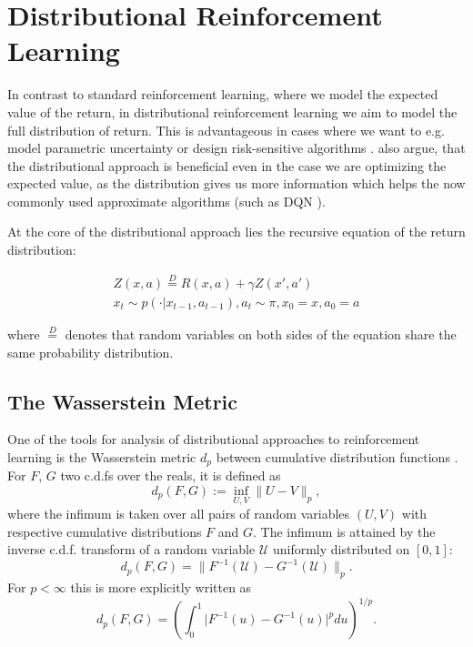 \section{Distributional Reinforcement Learning}

In contrast to standard reinforcement learning, where we model the expected value of the return, in distributional reinforcement learning \cite{many} we aim to model the full distribution of return. This is advantageous in cases where we want to e.g. model parametric uncertainty \cite{...} or design risk-sensitive algorithms \citep{morimura2012parametric}\citep{morimura2010nonparametric}. \citet{bellemare2017distributional} also argue, that the distributional approach is beneficial even in the case we are optimizing the expected value, as the distribution gives us more information which helps the now commonly used approximate algorithms (such as DQN \citep{mnih2015human}).

At the core of the distributional approach lies the recursive equation of the return distribution:

\begin{equation}
\begin{split}
Z(x, a) \overset{D}{=} R(x, a) + \gamma Z(x', a')\\
x_t \sim p(\cdot|x_{t-1}, a_{t-1}), a_t \sim \pi, x_0 = x, a_0 = a
\end{split}
\end{equation}

where $\overset{D}{=}$ denotes that random variables on both sides of the equation share the same probability distribution.

\subsection{The Wasserstein Metric}
\newcommand{\pnorm}[1]{\| #1 \|_p}

One of the tools for analysis of distributional approaches to reinforcement learning is the Wasserstein metric $d_p$ between cumulative distribution functions \citep[see e.g.][where it is called the Mallows metric]{bickel81asymptotic}. For $F$, $G$ two c.d.fs over the reals, it is defined as
\begin{equation*}
d_p(F, G) := \inf_{U, V} \pnorm{U - V},
\end{equation*}
where the infimum is taken over all pairs of random variables $(U, V)$ with respective cumulative distributions $F$ and $G$. The infimum is attained by the inverse c.d.f. transform of a random variable $\mathcal{U}$ uniformly distributed on $[0, 1]$:
\begin{equation*}
d_p(F, G) = \| F^{-1}(\mathcal{U}) - G^{-1}(\mathcal{U}) \|_p .
\end{equation*}
For $p < \infty$ this is more explicitly written as
\begin{equation}
d_p(F, G) = \left ( \int_0^1 \big | F^{-1}(u) - G^{-1}(u) \big |^p du \right )^{1/p} .
\end{equation}


